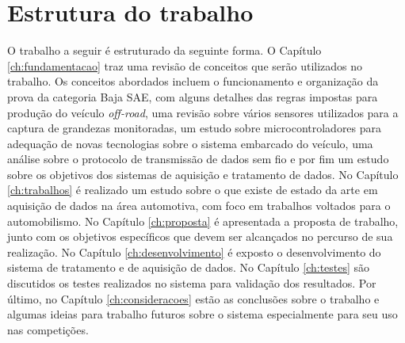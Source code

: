 \section{Estrutura do trabalho}

O trabalho a seguir é estruturado da seguinte forma. O Capítulo \ref{ch:fundamentacao} traz uma revisão de conceitos que serão utilizados no trabalho. Os conceitos abordados incluem o funcionamento e organização da prova da categoria Baja SAE, com alguns detalhes das regras impostas para produção do veículo \textit{off-road}, uma revisão sobre vários sensores utilizados para a captura de grandezas monitoradas, um estudo sobre microcontroladores para adequação de novas tecnologias sobre o sistema embarcado do veículo, uma análise sobre o protocolo de transmissão de dados sem fio e por fim um estudo sobre os objetivos dos sistemas de aquisição e tratamento de dados. No Capítulo \ref{ch:trabalhos} é realizado um estudo sobre o que existe de estado da arte em aquisição de dados na área automotiva, com foco em trabalhos voltados para o automobilismo. No Capítulo \ref{ch:proposta} é apresentada a proposta de trabalho, junto com os objetivos específicos que devem ser alcançados no percurso de sua realização. No Capítulo \ref{ch:desenvolvimento} é exposto o desenvolvimento do sistema de tratamento e de aquisição de dados. No Capítulo \ref{ch:testes} são discutidos os testes realizados no sistema para validação dos resultados. Por último, no Capítulo \ref{ch:consideracoes} estão as conclusões sobre o trabalho e algumas ideias para trabalho futuros sobre o sistema especialmente para seu uso nas competições.  
